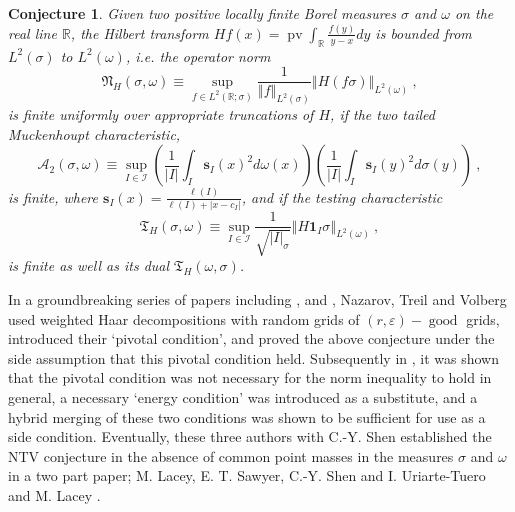 \documentclass{amsart}%
\theoremstyle{plain}
\newtheorem{conjecture}[theorem]{Conjecture}
\numberwithin{equation}{section}
\begin{document}
\begin{conjecture}
\cite{Vol}Given two positive locally finite Borel measures $\sigma$ and
$\omega$ on the real line $\mathbb{R}$, the Hilbert transform $Hf\left(
x\right)  =\operatorname{pv}\int_{\mathbb{R}}\frac{f\left(  y\right)  }%
{y-x}dy$ is bounded from $L^{2}\left(  \sigma\right)  $ to $L^{2}\left(
\omega\right)  $, i.e. the operator norm%
\begin{equation}
\mathfrak{N}_{H}\left(  \sigma,\omega\right)  \equiv\sup_{f\in L^{2}\left(
\mathbb{R};\sigma\right)  }\frac{1}{\left\Vert f\right\Vert _{L^{2}\left(
\sigma\right)  }}\left\Vert H\left(  f\sigma\right)  \right\Vert
_{L^{2}\left(  \omega\right)  }\ ,\label{Hilbert'}%
\end{equation}
is finite uniformly over appropriate truncations of $H$, if the two tailed
Muckenhoupt characteristic,%
\[
\mathcal{A}_{2}\left(  \sigma,\omega\right)  \equiv\sup_{I\in\mathcal{I}%
}\left(  \frac{1}{\left\vert I\right\vert }\int_{I}\mathbf{s}_{I}\left(
x\right)  ^{2}d\omega\left(  x\right)  \right)  \left(  \frac{1}{\left\vert
I\right\vert }\int_{I}\mathbf{s}_{I}\left(  y\right)  ^{2}d\sigma\left(
y\right)  \right)  \ ,
\]
is finite, where $\mathbf{s}_{I}\left(  x\right)  =\frac{\ell\left(  I\right)
}{\ell\left(  I\right)  +\left\vert x-c_{I}\right\vert }$, and if the testing
characteristic%
\begin{equation}
\mathfrak{T}_{H}\left(  \sigma,\omega\right)  \equiv\sup_{I\in\mathcal{I}%
}\frac{1}{\sqrt{\left\vert I\right\vert _{\sigma}}}\left\Vert H\mathbf{1}%
_{I}\sigma\right\Vert _{L^{2}\left(  \omega\right)  }\ ,\label{two testing}%
\end{equation}
is finite as well as its dual $\mathfrak{T}_{H}\left(  \omega,\sigma\right)  $.
\end{conjecture}

In a groundbreaking series of papers including \cite{NTV1},\cite{NTV2} and
\cite{NTV3}, Nazarov, Treil and Volberg used weighted Haar decompositions with
random grids of $\left(  r,\varepsilon\right)  -\operatorname{good}$ grids,
introduced their `pivotal condition', and proved the above conjecture under
the side assumption that this pivotal condition held. Subsequently in
\cite{LaSaUr2}, it was shown that the pivotal condition was not necessary for
the norm inequality to hold in general, a necessary `energy condition' was
introduced as a substitute, and a hybrid merging of these two conditions was
shown to be sufficient for use as a side condition. Eventually, these three
authors with C.-Y. Shen established the NTV conjecture in the absence of
common point masses in the measures $\sigma$ and $\omega$ in a two part paper;
M. Lacey, E. T. Sawyer, C.-Y. Shen and I. Uriarte-Tuero \cite{LaSaShUr3} and
M. Lacey \cite{Lac}.
\end{document}
